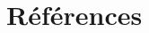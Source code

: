 \documentclass[11pt, french]{article}
\begin{document}
\renewcommand{\tablename}{Tableau}
\renewcommand{\listfigurename}{Liste des figures}




\begin{spacing}{1}
    \tableofcontents
\end{spacing}

\newpage

\begin{spacing}{1}
    \listoffigures
\end{spacing}

\newpage

\begin{spacing}{1}
    \listoftables
\end{spacing}

\newpage



\null\newpage

\newpage

\newpage


\newpage

\section{Références}
\printbibliography[heading=none]

\newpage

\begin{appendices}
    
\end{appendices}
\end{document}
